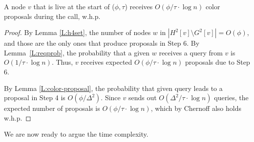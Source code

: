 \begin{lemma}
A node $v$ that is live at the start of ($\phi,\tau$) receives $O(\phi/\tau \cdot \log n)$ color proposals during the call, w.h.p.
\label{L:v-load}
\end{lemma}
\begin{proof}
By Lemma \ref{L:h4set}, the number of nodes $w$ in $|H^2[v] \setminus G^2[v]| = O(\phi)$, and those are the only ones that produce proposals in Step 6. By Lemma~\ref{L:reqprob}, the probability that a given $w$ receives a query from $v$ is $O(1/\tau \cdot \log n)$.  Thus, $v$ receives expected $O(\phi/\tau \cdot \log n)$ proposals due to Step 6.

By Lemma \ref{L:color-proposal}, the probability that  given query leads to a proposal in Step 4 is $O(\phi/\Delta^2)$. Since $v$ sends out $O(\Delta^2/\tau \cdot \log n)$ queries, the expected number of proposals is $O(\phi/\tau \cdot \log n)$, which by Chernoff also holds w.h.p.
\end{proof}

We are now ready to argue the time complexity.

